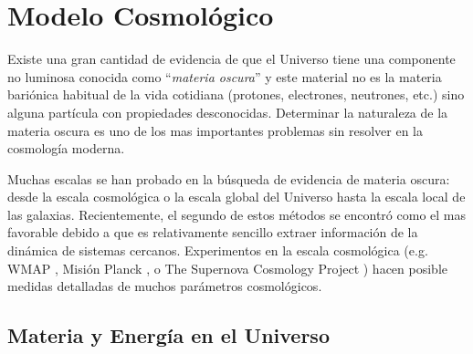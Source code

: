 
\chapter{Modelo Cosmológico}   %
\label{Chp:MatOsc}
\setcounter{equation}{0}


\setcounter{equation}{0}

Existe una gran cantidad de evidencia de que el Universo tiene una componente no luminosa conocida como ``\textit{materia oscura}'' y este material no es la materia bariónica habitual de la vida cotidiana (protones, electrones, neutrones, etc.) sino alguna  partícula con propiedades desconocidas. Determinar la naturaleza de la materia oscura es uno de los mas importantes  problemas sin resolver en la cosmología moderna.

Muchas escalas se han probado en la búsqueda de evidencia de materia oscura: desde la escala cosmológica o la escala global del Universo  hasta la escala local de las galaxias. Recientemente, el segundo de estos métodos se encontró como el mas favorable debido a que es relativamente sencillo extraer información de la dinámica de sistemas cercanos. Experimentos en la escala cosmológica (e.g. WMAP \cite{ 2013ApJS..208...20B}, Misión Planck \cite{2020A&A...641A...1P}, o The Supernova Cosmology Project \cite{1999ApJ...517..565P}) hacen posible medidas detalladas de muchos parámetros cosmológicos. %

\section{Materia y Energía en el Universo}

